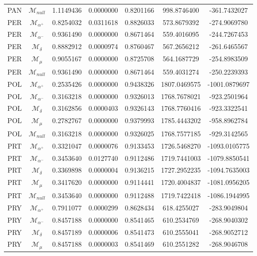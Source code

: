 \begin{tabular}{ccccccc}
PAN & $\mathcal{M}_{null}$ & 1.1149436 & 0.0000000 & 0.8201166 & 998.8746400 & -361.7432027\\
PER & $\mathcal{M}_{\alpha^+}$ & 0.8254032 & 0.0311618 & 0.8826033 & 573.8679392 & -274.9069780\\
PER & $\mathcal{M}_{\alpha^-}$ & 0.9361490 & 0.0000000 & 0.8671464 & 559.4016095 & -244.7267453\\
PER & $\mathcal{M}_{\delta}$ & 0.8882912 & 0.0000974 & 0.8760467 & 567.2656212 & -261.6465567\\
PER & $\mathcal{M}_{\mu}$ & 0.9055167 & 0.0000000 & 0.8725708 & 564.1687729 & -254.8983509\\
PER & $\mathcal{M}_{null}$ & 0.9361490 & 0.0000000 & 0.8671464 & 559.4031274 & -250.2239393\\
POL & $\mathcal{M}_{\alpha^+}$ & 0.2535426 & 0.0000000 & 0.9438326 & 1807.0469575 & -1001.0879697\\
POL & $\mathcal{M}_{\alpha^-}$ & 0.3163218 & 0.0000000 & 0.9326013 & 1768.7678021 & -923.2501964\\
POL & $\mathcal{M}_{\delta}$ & 0.3162856 & 0.0000403 & 0.9326143 & 1768.7760416 & -923.3322541\\
POL & $\mathcal{M}_{\mu}$ & 0.2782767 & 0.0000000 & 0.9379993 & 1785.4443202 & -958.8962784\\
POL & $\mathcal{M}_{null}$ & 0.3163218 & 0.0000000 & 0.9326025 & 1768.7577185 & -929.3142565\\
PRT & $\mathcal{M}_{\alpha^+}$ & 0.3321047 & 0.0000076 & 0.9133453 & 1726.5468270 & -1093.0105775\\
PRT & $\mathcal{M}_{\alpha^-}$ & 0.3453640 & 0.0127740 & 0.9112486 & 1719.7441003 & -1079.8850541\\
PRT & $\mathcal{M}_{\delta}$ & 0.3369898 & 0.0000004 & 0.9136215 & 1727.2952235 & -1094.7635003\\
PRT & $\mathcal{M}_{\mu}$ & 0.3417620 & 0.0000000 & 0.9114441 & 1720.4004837 & -1081.0956205\\
PRT & $\mathcal{M}_{null}$ & 0.3453640 & 0.0000000 & 0.9112488 & 1719.7422418 & -1086.1944995\\
PRY & $\mathcal{M}_{\alpha^+}$ & 0.7911077 & 0.0000299 & 0.8628434 & 618.4255027 & -283.9049804\\
PRY & $\mathcal{M}_{\alpha^-}$ & 0.8457188 & 0.0000000 & 0.8541465 & 610.2534769 & -268.9040302\\
PRY & $\mathcal{M}_{\delta}$ & 0.8457189 & 0.0000006 & 0.8541473 & 610.2555041 & -268.9052712\\
PRY & $\mathcal{M}_{\mu}$ & 0.8457188 & 0.0000003 & 0.8541469 & 610.2551282 & -268.9046708\\

\end{tabular}
